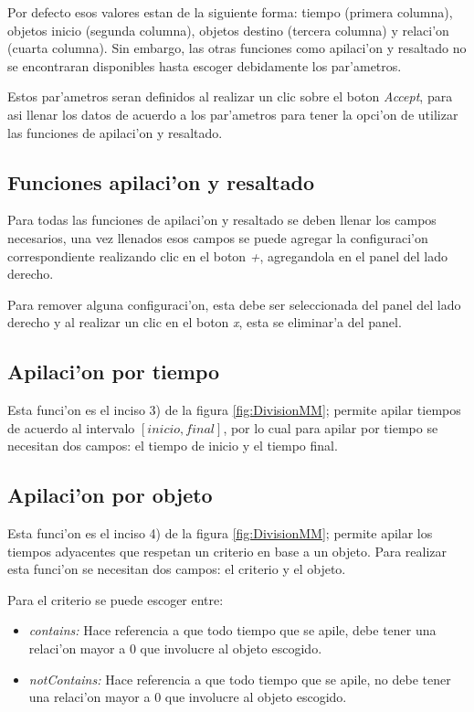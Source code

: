 Por defecto esos valores estan de la siguiente forma: tiempo (primera columna), objetos inicio (segunda columna), objetos destino (tercera columna) y relaci'on (cuarta columna). Sin embargo, las otras funciones como apilaci'on y resaltado no se encontraran disponibles hasta escoger debidamente los par'ametros.

Estos par'ametros seran definidos al realizar un clic sobre el boton \emph{Accept}, para asi llenar los datos de acuerdo a los par'ametros para tener la opci'on de utilizar las funciones de apilaci'on y resaltado.

\subsection{Funciones apilaci'on y resaltado}
Para todas las funciones de apilaci'on y resaltado se deben llenar los campos necesarios, una vez llenados esos campos se puede agregar la configuraci'on correspondiente realizando clic en el boton \emph{+}, agregandola en el panel del lado derecho.

Para remover alguna configuraci'on, esta debe ser seleccionada del panel del lado derecho y al realizar un clic en el boton \emph{x}, esta se eliminar'a del panel.

\subsection{Apilaci'on por tiempo}
Esta funci'on es el inciso 3) de la figura \ref{fig:DivisionMM}; permite apilar tiempos de acuerdo al intervalo $[inicio, final]$, por lo cual para apilar por tiempo se necesitan dos campos: el tiempo de inicio y el tiempo final.

\subsection{Apilaci'on por objeto}
Esta funci'on es el inciso 4) de la figura \ref{fig:DivisionMM}; permite apilar los tiempos adyacentes que respetan un criterio en base a un objeto. Para realizar esta funci'on se necesitan dos campos: el criterio y el objeto. 

Para el criterio se puede escoger entre:
\begin{itemize}
\item \emph{contains:} Hace referencia a que todo tiempo que se apile, debe tener una relaci'on mayor a 0 que involucre al objeto escogido.
\item \emph{notContains:} Hace referencia a que todo tiempo que se apile, no debe tener una relaci'on mayor a 0 que involucre al objeto escogido.
\end{itemize}

